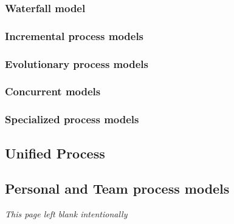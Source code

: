 \documentclass{article}
\begin{document}
	\subsubsection{Waterfall model}
	\subsubsection{Incremental process models}
	\subsubsection{Evolutionary process models}
	\subsubsection{Concurrent models}
	\subsubsection{Specialized process models}
	\subsection{Unified Process}
	\subsection{Personal and Team process models}
	\newpage \thispagestyle{empty}
	\vspace*{\fill}
		\centering \emph{\large This page left blank intentionally}
	\vspace*{\fill}
\end{document}
